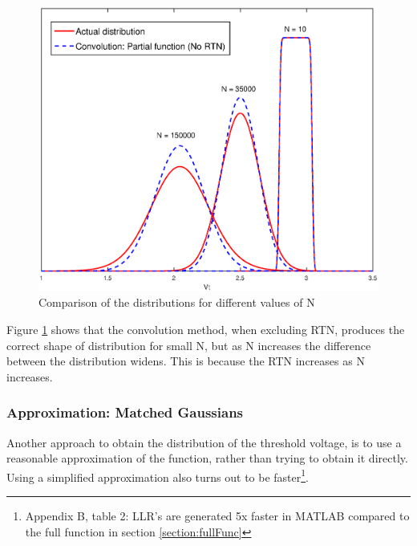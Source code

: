 \documentclass[11pt]{article}
\numberwithin{equation}{subsection}
\begin{document}
\begin{figure}[h]
\centering
\includegraphics[scale=0.6]{retention_convolution}
\caption{Comparison of the distributions for different values of N}
\label{fig:retentionVsFull}
\end{figure}
Figure \ref{fig:retentionVsFull} shows that the convolution method, when excluding RTN, produces the correct shape of distribution for small N, but as N increases the difference between the distribution widens. This is because the RTN increases as N increases.

\subsubsection{Approximation: Matched Gaussians}
Another approach to obtain the distribution of the threshold voltage, is to use a reasonable approximation of the function, rather than trying to obtain it directly. Using a simplified approximation also turns out to be faster\footnote{Appendix B, table 2: LLR's are generated 5x faster in MATLAB compared to the full function in section \ref{section:fullFunc}}.
\end{document}
